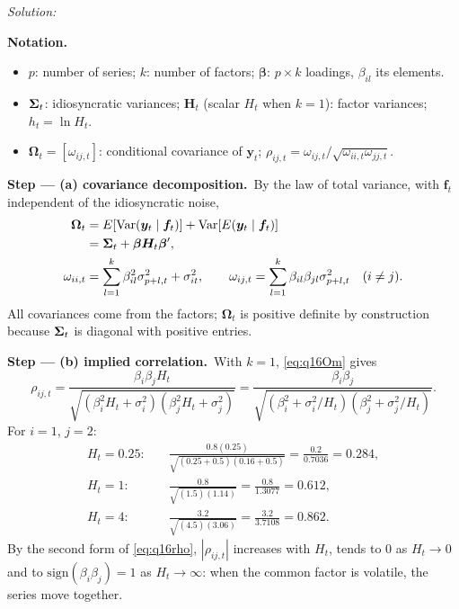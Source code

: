 \documentclass[11pt,a4paper]{article}
\newif\ifsolucoes
\newcommand{\espacoresol}{4.5cm}   %
\newenvironment{notacao}{\par\smallskip\noindent\textbf{Notation.}\begin{itemize}[leftmargin=1.4em,topsep=1pt,itemsep=0pt]\small}{\end{itemize}}
\newcommand{\resolespaco}{\ifsolucoes\else\par\textit{Solution:}\vspace{\espacoresol}\par\fi}
\newcommand{\passo}[2]{\par\smallskip\noindent\textbf{Step --- #1.}~#2}
\begin{document}
\resolespaco
\begin{sol}
\begin{notacao}
\item $p$: number of series; $k$: number of factors; $\bm\beta$: $p\times k$ loadings, $\beta_{il}$ its elements.
\item $\bm{\Sigma}_t$: idiosyncratic variances; $\bm H_t$ (scalar $H_t$ when $k=1$): factor variances; $h_t=\ln H_t$.
\item $\bm\Omega_t=[\omega_{ij,t}]$: conditional covariance of $\bm y_t$; $\rho_{ij,t}=\omega_{ij,t}/\sqrt{\omega_{ii,t}\omega_{jj,t}}$.
\end{notacao}

\passo{(a) covariance decomposition}{By the law of total variance, with $\bm f_t$ independent of the idiosyncratic noise,
\begin{align}
\bm\Omega_t&=E[\mathrm{Var}(\bm y_t\mid\bm f_t)]+\mathrm{Var}[E(\bm y_t\mid\bm f_t)]\nonumber\\
&=\bm{\Sigma}_t+\bm\beta\bm H_t\bm\beta',\label{eq:q16Om}\\
\omega_{ii,t}&=\sum_{l=1}^k\beta_{il}^2\sigma_{p+l,t}^2+\sigma_{it}^2,\qquad
\omega_{ij,t}=\sum_{l=1}^k\beta_{il}\beta_{jl}\sigma_{p+l,t}^2\quad(i\neq j).\nonumber
\end{align}
All covariances come from the factors; $\bm\Omega_t$ is positive definite by construction because $\bm{\Sigma}_t$ is diagonal
with positive entries.}

\passo{(b) implied correlation}{With $k=1$, \eqref{eq:q16Om} gives
\begin{equation}
\rho_{ij,t}=\frac{\beta_i\beta_jH_t}{\sqrt{(\beta_i^2H_t+\sigma_i^2)(\beta_j^2H_t+\sigma_j^2)}}
=\frac{\beta_i\beta_j}{\sqrt{(\beta_i^2+\sigma_i^2/H_t)(\beta_j^2+\sigma_j^2/H_t)}}.\label{eq:q16rho}
\end{equation}
For $i=1$, $j=2$:
\begin{align}
H_t=0.25:&\quad \frac{0.8(0.25)}{\sqrt{(0.25+0.5)(0.16+0.5)}}=\frac{0.2}{0.7036}=0.284,\nonumber\\
H_t=1:&\quad \frac{0.8}{\sqrt{(1.5)(1.14)}}=\frac{0.8}{1.3077}=0.612,\nonumber\\
H_t=4:&\quad \frac{3.2}{\sqrt{(4.5)(3.06)}}=\frac{3.2}{3.7108}=0.862.\nonumber
\end{align}
By the second form of \eqref{eq:q16rho}, $|\rho_{ij,t}|$ increases with $H_t$, tends to 0 as $H_t\to0$ and to
$\mathrm{sign}(\beta_i\beta_j)=1$ as $H_t\to\infty$: when the common factor is volatile, the series move together.}


\end{sol}
\end{document}
